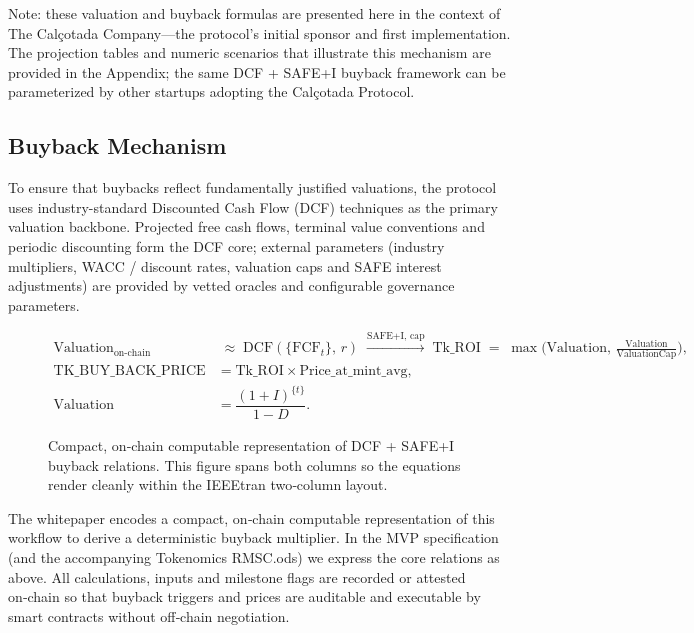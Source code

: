 \documentclass[conference]{IEEEtran}
\begin{document}
Note: these valuation and buyback formulas are presented here in the context of The Calçotada Company—the protocol's initial sponsor and first implementation. The projection tables and numeric scenarios that illustrate this mechanism are provided in the Appendix; the same DCF + SAFE+I buyback framework can be parameterized by other startups adopting the Calçotada Protocol.
\subsection{Buyback Mechanism}
To ensure that buybacks reflect fundamentally justified valuations, the protocol uses industry-standard Discounted Cash Flow (DCF) techniques as the primary valuation backbone. Projected free cash flows, terminal value conventions and periodic discounting form the DCF core; external parameters (industry multipliers, WACC / discount rates, valuation caps and SAFE interest adjustments) are provided by vetted oracles and configurable governance parameters.

\begin{figure}[!t]
\normalsize
\begin{equation}
\begin{aligned}
\text{Valuation}_{\text{on‑chain}} &\;\approx\; \mathrm{DCF}(\{\mathrm{FCF}_t\},\,r)
\;\xrightarrow{\text{SAFE+I, cap}}\;
\mathrm{Tk\_ROI} \;=\; \max\!\Big(\mathrm{Valuation},\,\frac{\mathrm{Valuation}}{\mathrm{ValuationCap}}\Big),\\[6pt]
\mathrm{TK\_BUY\_BACK\_PRICE} &= \mathrm{Tk\_ROI}\times\mathrm{Price\_at\_mint\_avg},\\[6pt]
\mathrm{Valuation} &= \dfrac{(1+I)^{\{t\}}}{1-D}.
\end{aligned}
\end{equation}
\caption{Compact, on‑chain computable representation of DCF + SAFE+I buyback relations. This figure spans both columns so the equations render cleanly within the IEEEtran two‑column layout.}
\label{fig:buyback_eqs}
\end{figure}

The whitepaper encodes a compact, on‑chain computable representation of this workflow to derive a deterministic buyback multiplier. In the MVP specification (and the accompanying Tokenomics RMSC.ods) we express the core relations as above. All calculations, inputs and milestone flags are recorded or attested on‑chain so that buyback triggers and prices are auditable and executable by smart contracts without off‑chain negotiation.
\end{document}

